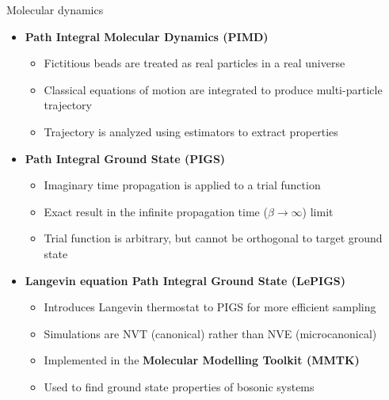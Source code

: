 \documentclass[final,t]{beamer}
\begin{document}
\begin{frame}{}
\begin{columns}[T]
\begin{column}{.31\linewidth}
	\begin{block}{Molecular dynamics}
		\begin{itemize}
			\item \textbf{Path Integral Molecular Dynamics (PIMD)}~\cite{ceperley1995path}
				\begin{itemize}
					\item Fictitious beads are treated as real particles in a real universe
					\item Classical equations of motion are integrated to produce multi-particle trajectory
					\item Trajectory is analyzed using estimators to extract properties
				\end{itemize}
			\item \textbf{Path Integral Ground State (PIGS)}~\cite{sarsa2000path,cuervo2005path}
				\begin{itemize}
					\item Imaginary time propagation is applied to a trial function
					\item Exact result in the infinite propagation time ($\beta \to \infty$) limit
					\item Trial function is arbitrary, but cannot be orthogonal to target ground state
				\end{itemize}
			\item \textbf{Langevin equation Path Integral Ground State (LePIGS)}~\cite{constable2013langevin}
				\begin{itemize}
					\item Introduces Langevin thermostat to PIGS for more efficient sampling
					\item Simulations are NVT (canonical) rather than NVE (microcanonical)
					\item Implemented in the \textbf{Molecular Modelling Toolkit (MMTK)}~\cite{hinsen2000molecular}
					\item Used to find ground state properties of bosonic systems
				\end{itemize}
		\end{itemize}
	\end{block}
\end{column}


\end{columns}
\end{frame}
\end{document}
